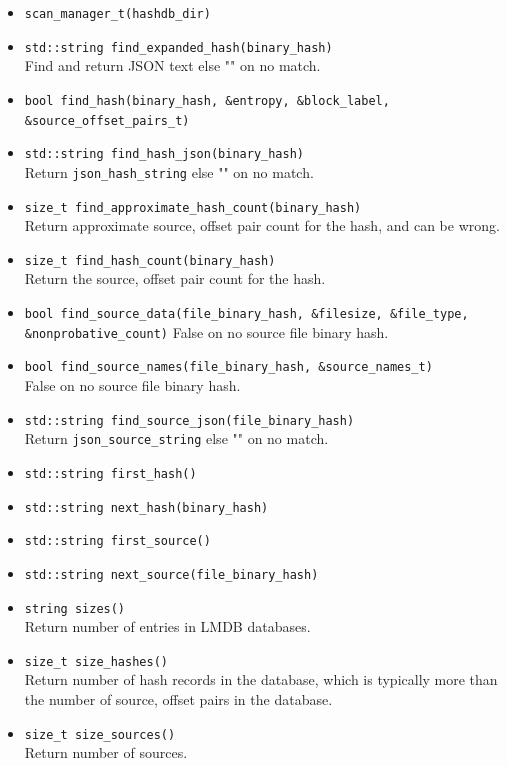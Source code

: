 \documentclass[11pt,fleqn]{article} %
\begin{document}
\begin{itemize}
\item \verb+scan_manager_t(hashdb_dir)+
\item \verb+std::string find_expanded_hash(binary_hash)+\\
Find and return JSON text else "" on no match.
\item \verb+bool find_hash(binary_hash, &entropy, &block_label, &source_offset_pairs_t)+\\
\item \verb+std::string find_hash_json(binary_hash)+\\
Return \verb+json_hash_string+ else "" on no match.
\item \verb+size_t find_approximate_hash_count(binary_hash)+\\
Return approximate source, offset pair count for the hash, and can be wrong.
\item \verb+size_t find_hash_count(binary_hash)+\\
Return the source, offset pair count for the hash.
\item \verb+bool find_source_data(file_binary_hash, &filesize, &file_type,+\\
\verb+&nonprobative_count)+
False on no source file binary hash.
\item \verb+bool find_source_names(file_binary_hash, &source_names_t)+\\
False on no source file binary hash.
\item \verb+std::string find_source_json(file_binary_hash)+\\
Return \verb+json_source_string+ else "" on no match.
\item \verb+std::string first_hash()+
\item \verb+std::string next_hash(binary_hash)+
\item \verb+std::string first_source()+
\item \verb+std::string next_source(file_binary_hash)+
\item \verb+string sizes()+\\
Return number of entries in LMDB databases.
\item \verb+size_t size_hashes()+\\
Return number of hash records in the database, which is typically more than the number of source, offset pairs in the database.
\item \verb+size_t size_sources()+\\
Return number of sources.
\end{itemize}
\end{document}
